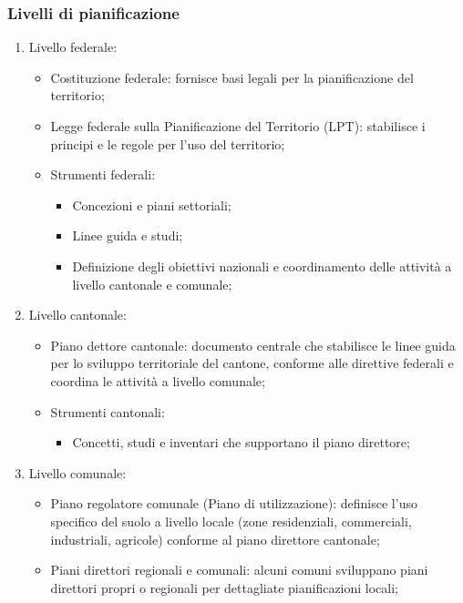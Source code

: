 \documentclass{article}
\begin{document}
\subsubsection{Livelli di pianificazione}
\begin{enumerate}
    \item Livello federale:
        \begin{itemize}
            \item Costituzione federale: fornisce basi legali per la pianificazione del
                territorio;
            \item Legge federale sulla Pianificazione del Territorio (LPT): stabilisce i
                principi e le regole per l'uso del territorio;
            \item Strumenti federali:
                \begin{itemize}
                    \item Concezioni e piani settoriali;
                    \item Linee guida e studi;
                    \item Definizione degli obiettivi nazionali e coordinamento delle attività
                        a livello cantonale e comunale;
                \end{itemize}
        \end{itemize}
    \item Livello cantonale:
        \begin{itemize}
            \item Piano dettore cantonale: documento centrale che stabilisce le linee guida per
                lo sviluppo territoriale del cantone, conforme alle direttive federali e
                coordina le attività a livello comunale;
            \item Strumenti cantonali:
                \begin{itemize}
                    \item Concetti, studi e inventari che supportano il piano direttore;
                \end{itemize}
        \end{itemize}
    \item Livello comunale:
        \begin{itemize}
            \item Piano regolatore comunale (Piano di utilizzazione): definisce l'uso specifico
                del suolo a livello locale (zone residenziali, commerciali, industriali,
                agricole) conforme al piano direttore cantonale;
            \item Piani direttori regionali e comunali: alcuni comuni sviluppano piani direttori
                propri o regionali per dettagliate pianificazioni locali;
        \end{itemize}
\end{enumerate}
\end{document}
